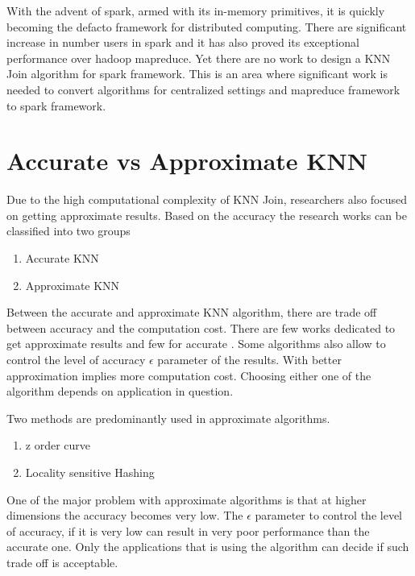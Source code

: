With the advent of spark, armed with its in-memory primitives, it is quickly becoming the defacto framework for
distributed computing. There are significant increase in number users
in spark and it has also proved its exceptional performance over
hadoop mapreduce. Yet there are no work to design a KNN Join algorithm
for spark framework. This is an area where significant
work is needed to convert algorithms for centralized settings and mapreduce framework  to spark
framework.

\section{Accurate vs Approximate KNN}

Due to the high computational complexity of KNN Join, researchers
also focused on getting approximate results. Based on the accuracy the
research works can be classified into two groups
\begin{enumerate}
\item Accurate KNN
\item Approximate KNN
\end{enumerate}


Between the accurate and approximate KNN algorithm, there are trade
off between accuracy and the computation cost. There are few
works dedicated to get approximate results \cite{stupar_rankreduceprocessing_2010}
\cite{zhang_efficient_2012} and few for accurate
\cite{jagadish_idistance:_2005} \cite{xia_gorder:_2004}
\cite{lu_efficient_2012}. Some algorithms also allow to control the
level of accuracy $\epsilon$  parameter of the results. With better approximation implies
more computation cost. Choosing either one of the algorithm depends on
application in question.

\medskip

Two methods are predominantly
used in approximate algorithms.
\begin{enumerate}
\item z order curve
\item Locality sensitive Hashing
\end{enumerate}

\medskip

One of the major problem with approximate algorithms is that at higher
dimensions the accuracy becomes very low. The $\epsilon$ parameter to
control the level of accuracy, if it is very low can result in very
poor performance than the accurate one. Only the applications that is
using the algorithm can decide if such trade off is acceptable.

